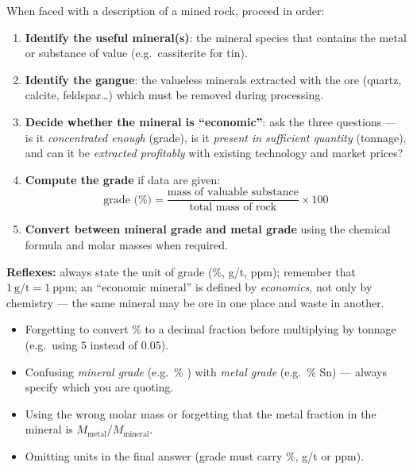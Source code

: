 \documentclass[11pt]{article}
\begin{document}
\begin{methode}
When faced with a description of a mined rock, proceed in order:
\begin{enumerate}
\item \textbf{Identify the useful mineral(s)}: the mineral species that contains the metal or substance of value (e.g.\ cassiterite  for tin).
\item \textbf{Identify the gangue}: the valueless minerals extracted with the ore (quartz, calcite, feldspar\ldots) which must be removed during processing.
\item \textbf{Decide whether the mineral is ``economic''}: ask the three questions — is it \emph{concentrated enough} (grade), is it \emph{present in sufficient quantity} (tonnage), and can it be \emph{extracted profitably} with existing technology and market prices?
\item \textbf{Compute the grade} if data are given:
\[
\text{grade (\%)} = \frac{\text{mass of valuable substance}}{\text{total mass of rock}} \times 100
\]
\item \textbf{Convert between mineral grade and metal grade} using the chemical formula and molar masses when required.
\end{enumerate}
\textbf{Reflexes:} always state the unit of grade (\%, g/t, ppm); remember that $1\ \mathrm{g/t} = 1\ \mathrm{ppm}$; an ``economic mineral'' is defined by \emph{economics}, not only by chemistry — the same mineral may be ore in one place and waste in another.
\end{methode}

\begin{attention}
\begin{itemize}
\item Forgetting to convert \% to a decimal fraction before multiplying by tonnage (e.g.\ using $5$ instead of $0.05$).
\item Confusing \emph{mineral grade} (e.g.\ \% ) with \emph{metal grade} (e.g.\ \% Sn) — always specify which you are quoting.
\item Using the wrong molar mass or forgetting that the metal fraction in the mineral is $M_{\text{metal}} / M_{\text{mineral}}$.
\item Omitting units in the final answer (grade must carry \%, g/t or ppm).
\end{itemize}
\end{attention}
\end{document}
